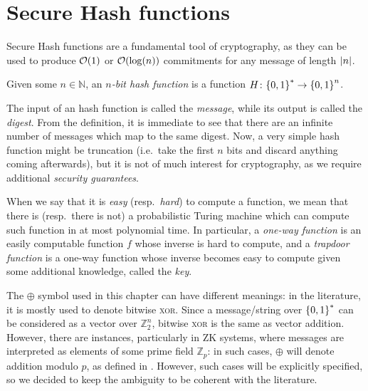 \section{Secure Hash functions}
Secure Hash functions are a fundamental tool of cryptography, as they can be used to produce 
\(\BigO{1}\) or \(\BigO{\call{\log}{n}}\) commitments for any message of length \(\left\lvert n\right\rvert\).
\begin{definition}
  Given some \(n \in \mathbb{N}\), an \emph{\(n\)-bit hash function} is a function 
  \(H\colon \Set{0, 1}^{*} \to \Set{0, 1}^{n}\).
\end{definition}
The input of an hash function is called the \emph{message}, while its output is called the 
\emph{digest}.
From the definition, it is immediate to see that there are an infinite number of messages which map
to the same digest.
Now, a very simple hash function might be truncation (i.e.\ take the first \(n\) bits and discard 
anything coming afterwards), but it is not of much interest for cryptography, as we require 
additional \emph{security guarantees}.
\begin{remark}
  When we say that it is \emph{easy} (resp.\  \emph{hard}) to compute a function, we mean that 
  there is (resp.\ there is not) a probabilistic Turing machine which can compute such function in
  at most polynomial time.
  In particular, a \emph{one-way function} is an easily computable function \(f\) whose inverse is 
  hard to compute, and a \emph{trapdoor function} is a one-way function whose inverse becomes easy 
  to compute given some additional knowledge, called the \emph{key}.
\end{remark}

\begin{remark}\label{rem:xor_vs_add}
	The \(\oplus \) symbol used in this chapter can have different meanings: in the literature, 
	it is mostly used to denote bitwise \textsc{xor}. Since a message/string over \(\left\{0, 1\right\}^{*}\) 
	can be considered as a vector over \(\mathbb{Z}_{2}^n\), bitwise \textsc{xor} is the same as 
	vector addition.
	However, there are instances, particularly in ZK systems, where messages are interpreted as 
	elements of some prime field \(\mathbb{Z}_p\): in such cases, \(\oplus \) will denote addition
	modulo \(p\), as defined in .
	However, such cases will be explicitly specified, so we decided to keep the ambiguity to be 
	coherent with the literature.
\end{remark}


